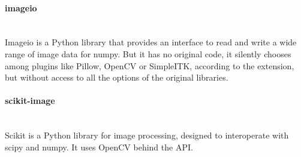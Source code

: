 \paragraph{imageio} \hspace{0pt} \\
Imageio is a Python library that provides an interface to read and write a wide range of image data for numpy. But it has no original code, it silently chooses among plugins like Pillow, OpenCV or SimpleITK, according to the extension, but without access to all the options of the original libraries.

\paragraph{scikit-image} \hspace{0pt} \\
Scikit is a Python library for image processing, designed to interoperate with scipy and numpy. It uses OpenCV behind the API.


